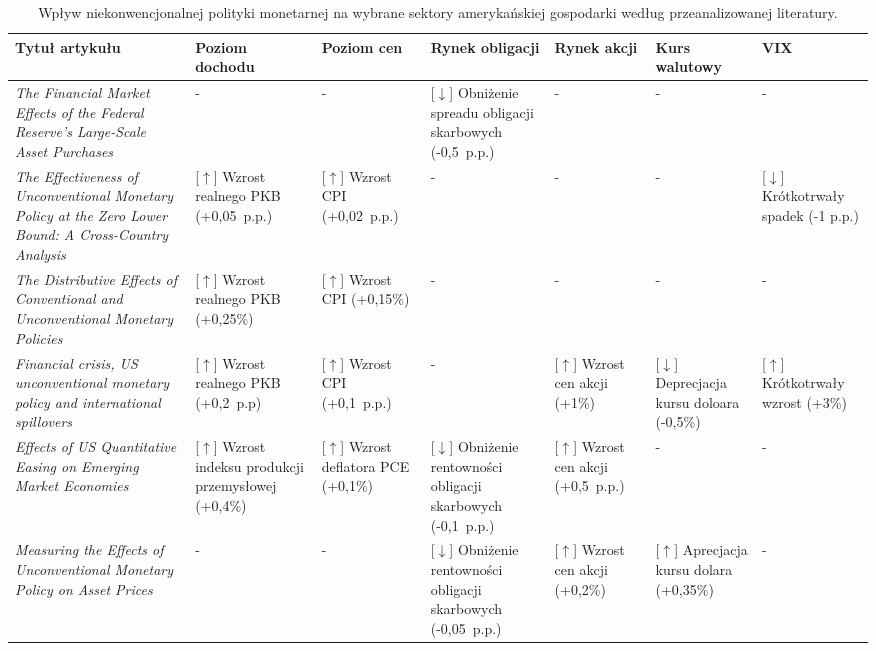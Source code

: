 \newpage
\begin{landscape} %
\hypertarget{tab0}{}
\begin{table}[!ht]
\captionsetup{format=hang, position=top}
\caption{Wpływ niekonwencjonalnej polityki monetarnej na wybrane sektory amerykańskiej gospodarki według przeanalizowanej literatury.}
\begin{tabular}{M{5cm}M{3cm}M{2.5cm}M{3cm}M{3cm}M{2.5cm}M{3cm}}
\toprule
\textbf{Tytuł artykułu} & \textbf{Poziom dochodu} & \textbf{Poziom cen} & \textbf{Rynek obligacji} & \textbf{Rynek akcji} & \textbf{Kurs walutowy} & \textbf{VIX} \\
\midrule
\textit{The Financial Market Effects of the Federal Reserve’s Large-Scale Asset Purchases}\cite{gagnon34} & - & - & [{\color{red}$\downarrow$}] Obniżenie spreadu obligacji skarbowych (-0,5~p.p.) & - & - & - \\
\textit{The Effectiveness of Unconventional Monetary Policy at the Zero Lower Bound: A Cross-Country Analysis}\cite{gambacorta35} & [{\color{ForestGreen}$\uparrow$}] Wzrost realnego PKB (+0,05~p.p.) & [{\color{ForestGreen}$\uparrow$}] Wzrost CPI (+0,02~p.p.) & - & - & - & [{\color{red}$\downarrow$}] Krótkotrwały spadek (-1 p.p.) \\
\textit{The Distributive Effects of Conventional and Unconventional Monetary Policies}\cite{davtyan35} & [{\color{ForestGreen}$\uparrow$}] Wzrost realnego PKB (+0,25\%) & [{\color{ForestGreen}$\uparrow$}] Wzrost CPI (+0,15\%) & - & - & - & - \\
\textit{Financial crisis, US unconventional monetary policy and international spillovers}\cite{chen36} & [{\color{ForestGreen}$\uparrow$}] Wzrost realnego PKB (+0,2~p.p) & [{\color{ForestGreen}$\uparrow$}] Wzrost CPI (+0,1~p.p.) & - & [{\color{ForestGreen}$\uparrow$}] Wzrost cen akcji (+1\%) & [{\color{red}$\downarrow$}] Deprecjacja kursu doloara (-0,5\%) & [{\color{ForestGreen}$\uparrow$}] Krótkotrwały wzrost (+3\%) \\
\textit{Effects of US Quantitative Easing on Emerging Market Economies}\cite{bhattarai36} & [{\color{ForestGreen}$\uparrow$}] Wzrost indeksu produkcji przemysłowej (+0,4\%) & [{\color{ForestGreen}$\uparrow$}] Wzrost deflatora PCE (+0,1\%) & [{\color{red}$\downarrow$}] Obniżenie rentowności obligacji skarbowych (-0,1~p.p.) & [{\color{ForestGreen}$\uparrow$}] Wzrost cen akcji (+0,5~p.p.) & - & - \\
\textit{Measuring the Effects of Unconventional Monetary Policy on Asset Prices}\cite{swanson37} & - & - & [{\color{red}$\downarrow$}] Obniżenie rentowności obligacji skarbowych (-0,05~p.p.) & [{\color{ForestGreen}$\uparrow$}] Wzrost cen akcji (+0,2\%) &  [{\color{ForestGreen}$\uparrow$}] Aprecjacja kursu dolara (+0,35\%) & - \\

\end{tabular}
\end{table}
\end{landscape}
